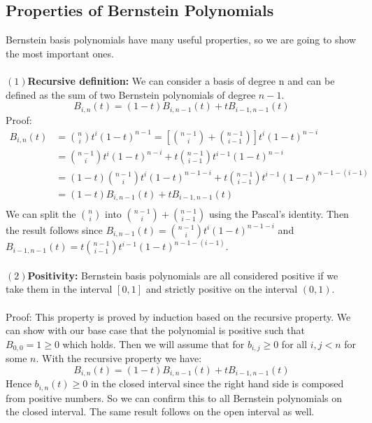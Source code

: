 \documentclass{article}
\begin{document}
\subsection{Properties of Bernstein Polynomials}
Bernstein basis polynomials have many useful properties, so we are going to show the most important ones.\paragraph{}
$(1)$\textbf{Recursive definition:}
We can consider a basis of degree n and can be defined as the sum of two Bernstein polynomials of degree $n-1$.
\begin{equation}
B_{i,n}(t)=(1-t)B_{i,n-1}(t)+tB_{i-1,n-1}(t)    
\end{equation}
Proof:
\begin{align*}
B_{i,n}(t)&=\binom{n}{i}t^i(1-t)^{n-1}=\left[\binom{n-1}{i}+\binom{n-1}{i-1}\right]t^i(1-t)^{n-i}\\
&=\binom{n-1}{i}t^i(1-t)^{n-i}+t\binom{n-1}{i-1}t^{i-1}(1-t)^{n-i}\\
&=(1-t)\binom{n-1}{i}t^i(1-t)^{n-1-i}+t\binom{n-1}{i-1}t^{i-1}(1-t)^{n-1-(i-1)}\\
&=(1-t)B_{i,n-1}(t)+tB_{i-1,n-1}(t)\\
\end{align*}
We can split the $\binom{n}{i}$ into $\binom{n-1}{i}+\binom{n-1}{i-1}$ using the Pascal’s identity. Then the result follows since $B_{i,n-1}(t)=\binom{n-1}{i}t^i(1-t)^{n-1-i}$ and $B_{i-1,n-1}(t)=t\binom{n-1}{i-1}t^{i-1}(1-t)^{n-1-(i-1)}$.\paragraph{}
$(2)$\textbf{Positivity:}
Bernstein basis polynomials are all considered positive if we take them in the interval $[0,1]$ and strictly positive on the interval $(0,1)$.\paragraph{}
Proof: This property is proved by induction based on the recursive property.
We can show with our base case that the polynomial is positive such that $B_{0,0}=1\geq0$ which holds. Then we will assume that for $b_{i,j}\geq0$ for all $i,j<n$ for some $n$. With the recursive property we have:
\begin{equation}
B_{i,n}(t)=(1-t)B_{i,n-1}(t)+tB_{i-1,n-1}(t)    
\end{equation}
Hence $b_{i,n}(t)\geq0$ in the closed interval since the right hand side is composed from positive numbers. So we can confirm this to all Bernstein polynomials on the closed interval. The same result follows on the open interval as well.\paragraph{}
\end{document}
